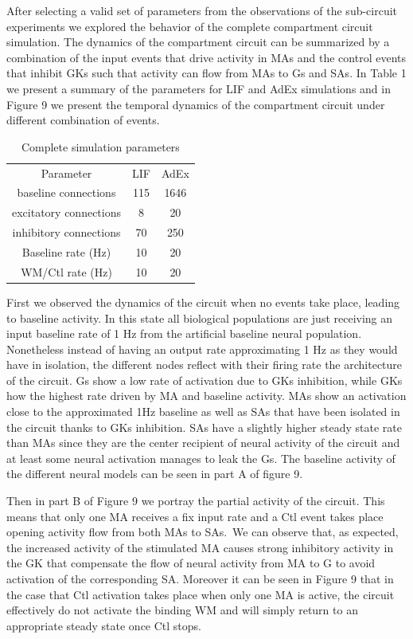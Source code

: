 \documentclass[10pt]{article}
\begin{document}
{\label{444332}}

After selecting a valid set of parameters from the observations of the
sub-circuit experiments we explored the behavior of the complete
compartment circuit simulation. The dynamics of the compartment
circuit can be summarized by a combination of the input events that
drive activity in MAs and the control events that inhibit GKs such
that activity can flow from MAs to Gs and SAs. In Table 1 we present a
summary of the parameters for LIF and AdEx simulations and in Figure 9
we present the temporal dynamics of the compartment circuit under
different combination of events.

\begin{table}[h!]
  \centering \normalsize
  \begin{tabular}{ccc}
    Parameter & LIF & AdEx \\
    baseline connections & 115 & 1646 \\
    excitatory connections & 8 & 20 \\
    inhibitory connections & 70 & 250 \\
    Baseline rate (Hz) & 10 & 20 \\
    WM/Ctl rate (Hz) & 10 & 20 \\
  \end{tabular}
  \caption{Complete simulation parameters}
  \label{917316}
\end{table}

First we observed the dynamics of the circuit when no events take
place, leading to baseline activity. In this state all biological
populations are just receiving an input baseline rate of 1 Hz from the
artificial baseline neural population. Nonetheless instead of having
an output rate approximating 1 Hz as they would have in isolation, the
different nodes reflect with their firing rate the architecture of the
circuit. Gs show a low rate of activation due to GKs inhibition, while
GKs how the highest rate driven by MA and baseline activity. MAs show
an activation close to the approximated 1Hz baseline as well as SAs
that have been isolated in the circuit thanks to GKs inhibition. SAs
have a slightly higher steady state rate than MAs since they are the
center recipient of neural activity of the circuit and at least some
neural activation manages to leak the Gs. The baseline activity of the
different neural models can be seen in part A of figure 9.

Then in part B of Figure 9 we portray the partial activity of the
circuit. This means that only one MA receives a fix input rate and a
Ctl event takes place opening activity flow from both MAs to SAs.~We
can observe that, as expected, the increased activity of the
stimulated MA causes strong inhibitory activity in the GK that
compensate the flow of neural activity from MA to G to avoid
activation of the corresponding SA. Moreover it can be seen in Figure
9 that in the case that Ctl activation takes place when only one MA is
active, the circuit effectively do not activate the binding WM and
will simply return to an appropriate steady state once Ctl stops.
\end{document}
